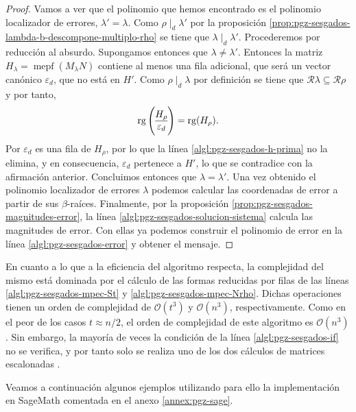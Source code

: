 \begin{proof}
  Vamos a ver que el polinomio que hemos encontrado es el polinomio localizador de errores, \(\lambda' = \lambda\).
  Como \(\rho \mid_d \lambda'\) por la proposición \ref{prop:pgz-sesgados-lambda-b-descompone-multiplo-rho} se tiene que \(\lambda \mid_d \lambda'\).
  Procederemos por reducción al absurdo.
  Supongamos entonces que \(\lambda \neq \lambda'\).
  Entonces la matriz \(H_{\lambda} = \operatorname{mepf}(M_{\lambda}N)\) contiene al menos una fila adicional, que será un vector canónico \(\varepsilon_{d}\), que no está en \(H'\).
  Como \(\rho \mid_d \lambda\) por definición se tiene que \(\mathcal R\lambda \subseteq \mathcal R\rho\) y por tanto,
  \[
    \rank\left( \begin{array}{@{}c@{}}
      H_{\rho}\\\hline
      \varepsilon_{d}
    \end{array}\right) = \rank (H_{\rho}).
  \]
  Por \parencite[Lema 2.4]{gomez-torrecillas_petersongorensteinzierler_2018} \(\varepsilon_{d}\) es una fila de \(H_{\rho}\), por lo que la línea \ref{algl:pgz-sesgados-h-prima} no la elimina, y en consecuencia, \(\varepsilon_{d}\) pertenece a \(H'\), lo que se contradice con la afirmación anterior.
  Concluimos entonces que \(\lambda = \lambda'\).
  Una vez obtenido el polinomio localizador de errores \(\lambda\) podemos calcular las coordenadas de error a partir de sus \(\beta\)-raíces.
  Finalmente, por la proposición \ref{prop:pgz-sesgados-magnitudes-error}, la línea \ref{algl:pgz-sesgados-solucion-sistema} calcula las magnitudes de error.
  Con ellas ya podemos construir el polinomio de error en la línea \ref{algl:pgz-sesgados-error} y obtener el mensaje.
\end{proof}

En cuanto a lo que a la eficiencia del algoritmo respecta, la complejidad del mismo está dominada por el cálculo de las formas reducidas por filas de las líneas \ref{algl:pgz-sesgados-mpec-St} y \ref{algl:pgz-sesgados-mpec-Nrho}.
Dichas operaciones tienen un orden de complejidad de \(\mathcal{O}(t^3)\) y \(\mathcal{O}(n^3)\), respectivamente.
Como en el peor de los casos \(t \approx n/2\), el orden de complejidad de este algoritmo es \(\mathcal{O}(n^3)\).
Sin embargo, la mayoría de veces la condición de la línea \ref{algl:pgz-sesgados-if} no se verifica, y por tanto solo se realiza uno de los dos cálculos de matrices escalonadas \parencite[ver][Remark 1]{gomez-torrecillas_petersongorensteinzierler_2018}.

Veamos a continuación algunos ejemplos utilizando para ello la implementación en SageMath comentada en el anexo \ref{annex:pgz-sage}.

